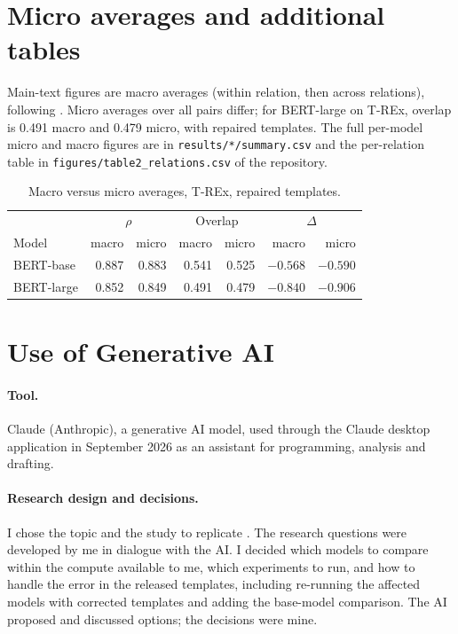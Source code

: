 \documentclass{article}
\begin{document}
\section{Micro averages and additional tables}
\label{app:micro}

Main-text figures are macro averages (within relation, then across relations), following
\citet{petroni2019}. Micro averages over all pairs differ; for BERT-large on T-REx, overlap is
0.491 macro and 0.479 micro, with repaired templates. The full per-model micro and macro
figures are in \texttt{results/*/summary.csv} and the per-relation table in
\texttt{figures/table2\_relations.csv} of the repository.

\begin{table}[h]
\centering\small
\caption{Macro versus micro averages, T-REx, repaired templates.}
\begin{tabular}{lrrrrrr}
\toprule
& \multicolumn{2}{c}{$\rho$} & \multicolumn{2}{c}{Overlap} & \multicolumn{2}{c}{$\Delta$} \\
Model & macro & micro & macro & micro & macro & micro \\
\midrule
BERT-base  & 0.887 & 0.883 & 0.541 & 0.525 & $-0.568$ & $-0.590$ \\
BERT-large & 0.852 & 0.849 & 0.491 & 0.479 & $-0.840$ & $-0.906$ \\
\bottomrule
\end{tabular}
\end{table}

\section{Use of Generative AI}
\label{app:ai}

\paragraph{Tool.} Claude (Anthropic), a generative AI model, used through the Claude desktop
application in September 2026 as an assistant for programming, analysis and drafting.

\paragraph{Research design and decisions.} I chose the topic and the study to replicate
\citep{kassner2020}. The research questions were developed by me in dialogue with the AI. I decided
which models to compare within the compute available to me, which experiments to run, and how to
handle the error in the released templates, including re-running the affected models with corrected
templates and adding the base-model comparison. The AI proposed and discussed options; the decisions
were mine.
\end{document}
